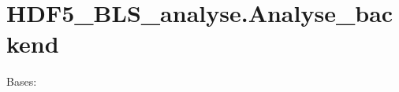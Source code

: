 \documentclass[letterpaper,10pt,english]{sphinxmanual}
\begin{document}
\sphinxstepscope


\section{HDF5\_BLS\_analyse.Analyse\_backend}
\label{\detokenize{source/_autosummary/HDF5_BLS_analyse.Analyse_backend:hdf5-bls-analyse-analyse-backend}}\label{\detokenize{source/_autosummary/HDF5_BLS_analyse.Analyse_backend::doc}}

\begin{fulllineitems}
\label{\detokenize{source/_autosummary/HDF5_BLS_analyse.Analyse_backend:HDF5_BLS_analyse.Analyse_backend}}
\pysigstartsignatures
\pysiglinewithargsret
{}
{\sphinxparamcomma {}}
{}
\pysigstopsignatures
\sphinxAtStartPar
Bases: 


\end{fulllineitems}
\end{document}
